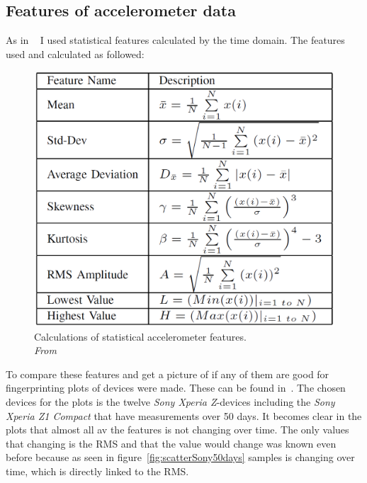 \subsection{Features of accelerometer data}\label{sec:featuresAcc}
As in ~\cite{sensor:accelPrint} I used statistical features calculated by the time domain. The features used and calculated as followed:
\begin{figure}[H]
	\centering
	\includegraphics[scale=.35]{img/featureCalc}
	\caption{Calculations of statistical accelerometer features. \\\textit{From~\cite[p.6]{sensor:accelPrint}}}
	\label{fig:accFeatures}
\end{figure}
To compare these features and get a picture of if any of them are good for fingerprinting plots of devices were made. These can be found in~. The chosen devices for the plots is the twelve \textit{Sony Xperia Z}-devices including the \textit{Sony Xperia Z1 Compact} that have measurements over 50 days. It becomes clear in the plots that almost all av the features is not changing over time. The only values that changing is the RMS and that the value would change was known even before because as seen in figure~\ref{fig:scatterSony50days} samples is changing over time, which is directly linked to the RMS.

